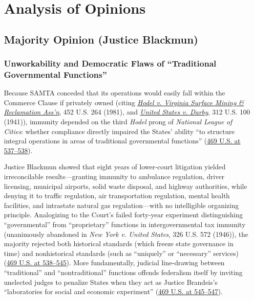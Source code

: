 \documentclass[12pt]{article}
\begin{document}
\section{Analysis of Opinions}
\subsection{Majority Opinion (Justice Blackmun)}

\subsubsection{Unworkability and Democratic Flaws of ``Traditional Governmental Functions''}

Because SAMTA conceded that its operations would easily fall within the Commerce Clause if privately owned (citing \href{https://supreme.justia.com/cases/federal/us/452/264/}{\textit{Hodel v. Virginia Surface Mining \& Reclamation Ass'n}}, 452 U.S. 264 (1981), and \href{https://supreme.justia.com/cases/federal/us/312/100/}{\textit{United States v. Darby}}, 312 U.S. 100 (1941)), immunity depended on the third \textit{Hodel} prong of \textit{National League of Cities}: whether compliance directly impaired the States' ability ``to structure integral operations in areas of traditional governmental functions'' (\href{https://supreme.justia.com/cases/federal/us/469/528/}{469 U.S. at 537--538}).

Justice Blackmun showed that eight years of lower-court litigation yielded irreconcilable results---granting immunity to ambulance regulation, driver licensing, municipal airports, solid waste disposal, and highway authorities, while denying it to traffic regulation, air transportation regulation, mental health facilities, and intrastate natural gas regulation---with no intelligible organizing principle. Analogizing to the Court's failed forty-year experiment distinguishing ``governmental'' from ``proprietary'' functions in intergovernmental tax immunity (unanimously abandoned in \textit{New York v. United States}, 326 U.S. 572 (1946)), the majority rejected both historical standards (which freeze state governance in time) and nonhistorical standards (such as ``uniquely'' or ``necessary'' services) (\href{https://supreme.justia.com/cases/federal/us/469/528/}{469 U.S. at 538--545}). More fundamentally, judicial line-drawing between ``traditional'' and ``nontraditional'' functions offends federalism itself by inviting unelected judges to penalize States when they act as Justice Brandeis's ``laboratories for social and economic experiment'' (\href{https://supreme.justia.com/cases/federal/us/469/528/}{469 U.S. at 545--547}).
\end{document}
